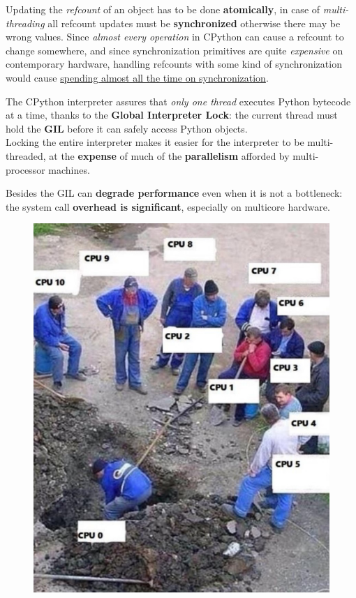 Updating the \textit{refcount} of an object has to be done \textbf{atomically}, 
in case of \textit{multi-threading} all refcount updates must be \textbf{synchronized} otherwise there may be wrong values.
Since \textit{almost every operation} in CPython can cause a refcount to change somewhere,
and since synchronization primitives are quite \textit{expensive} on
contemporary hardware, handling refcounts with some kind of
synchronization would cause \underline{spending almost all the time on synchronization}.
\begin{paracol}{2}
\colfill

The CPython interpreter assures that \textit{only one thread} executes Python bytecode at a time, thanks to the \textbf{Global
Interpreter Lock}:
the current thread must hold the \textbf{GIL} before it can safely access Python objects.\\
Locking the entire interpreter makes it easier for the
interpreter to be multi-threaded, at the \textbf{expense} of much of
the \textbf{parallelism} afforded by multi-processor machines.

Besides the GIL can \textbf{degrade performance} even when it is
not a bottleneck:
the system call \textbf{overhead is significant},
especially on multicore hardware.

\colfill
\switchcolumn
\begin{figure}[htbp]
   \centering
   \includegraphics[width=0.7\columnwidth]{images/python_concurrency.png}
   \label{fig:python_concurrency}
\end{figure}
\end{paracol}

